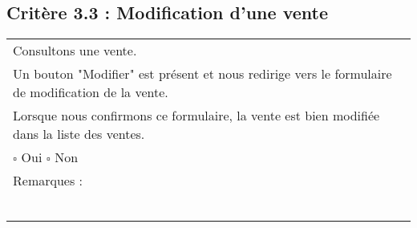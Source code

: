 \subsection*{Critère 3.3 : Modification d'une vente }
  		\begin{center}
    	 		\begin{tabular}[h]{|p{}|}
			\hline
				Consultons une vente. \\
				Un bouton "Modifier" est présent et nous redirige vers le formulaire de modification de la vente. \\
				Lorsque nous confirmons ce formulaire, la vente est bien modifiée dans la liste des ventes. \\%
				
				$\square$ Oui  \hfill \hfill $\square$ Non \\\hline Remarques : \\ ~\\
			 \\\hline
     		\end{tabular}
  		\end{center}	
